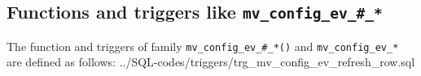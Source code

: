 \subsection{Functions and triggers like \texttt{mv\_config\_ev\_\#\_*}}\label{subsec_appx_trg_mv_config_ev_refresh_row}

The function and triggers of family \texttt{mv\_config\_ev\_\#\_*()} and \texttt{mv\_config\_ev\_*} are defined as follows:
%
{../SQL-codes/triggers/trg_mv_config_ev_refresh_row.sql}

